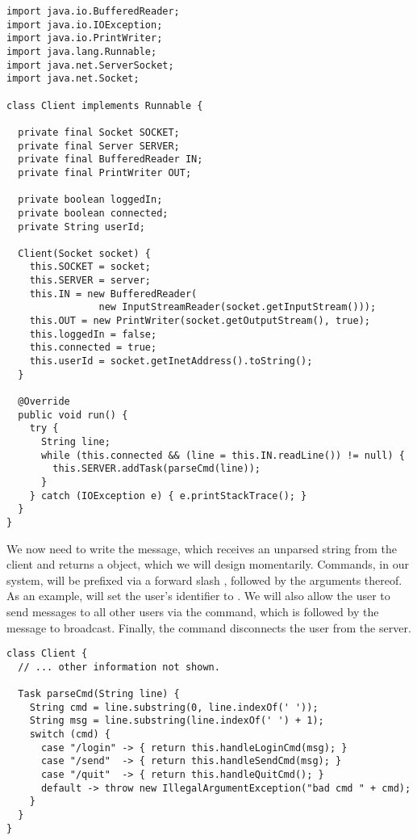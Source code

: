 \begin{lstlisting}[language=MyJava]
import java.io.BufferedReader;
import java.io.IOException;
import java.io.PrintWriter;
import java.lang.Runnable;
import java.net.ServerSocket;
import java.net.Socket;

class Client implements Runnable {

  private final Socket SOCKET;
  private final Server SERVER;
  private final BufferedReader IN;
  private final PrintWriter OUT;

  private boolean loggedIn;
  private boolean connected;
  private String userId;

  Client(Socket socket) {
    this.SOCKET = socket;
    this.SERVER = server;
    this.IN = new BufferedReader(
                new InputStreamReader(socket.getInputStream()));
    this.OUT = new PrintWriter(socket.getOutputStream(), true);
    this.loggedIn = false;
    this.connected = true;
    this.userId = socket.getInetAddress().toString();
  }

  @Override
  public void run() {
    try {
      String line;
      while (this.connected && (line = this.IN.readLine()) != null) { 
        this.SERVER.addTask(parseCmd(line)); 
      }
    } catch (IOException e) { e.printStackTrace(); }
  }
}
\end{lstlisting}

We now need to write the  message, which receives an unparsed string from the client and returns a  object, which we will design momentarily. 
Commands, in our system, will be prefixed via a forward slash \ttt{/}, followed by the arguments thereof. 
As an example,  will set the user's identifier to . 
We will also allow the user to send messages to all other users via the  command, which is followed by the message to broadcast. 
Finally, the  command disconnects the user from the server.

\begin{lstlisting}[language=MyJava]
class Client {
  // ... other information not shown.

  Task parseCmd(String line) {
    String cmd = line.substring(0, line.indexOf(' '));
    String msg = line.substring(line.indexOf(' ') + 1);
    switch (cmd) {
      case "/login" -> { return this.handleLoginCmd(msg); }
      case "/send"  -> { return this.handleSendCmd(msg); }
      case "/quit"  -> { return this.handleQuitCmd(); }
      default -> throw new IllegalArgumentException("bad cmd " + cmd);
    }
  }
}
\end{lstlisting}

